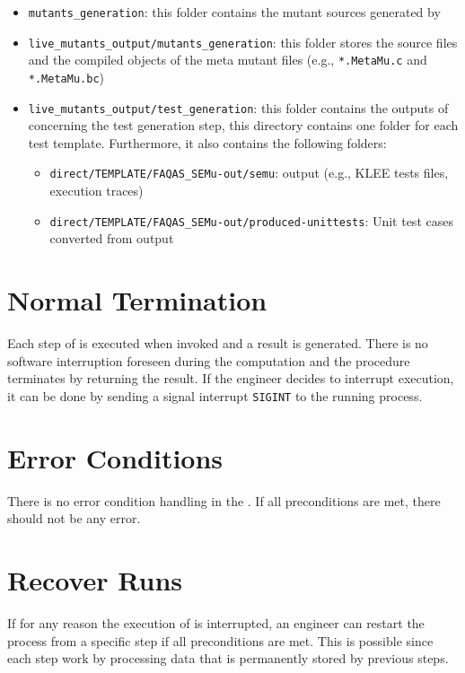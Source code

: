 \begin{itemize}
	\item \texttt{mutants\_generation}: this folder contains the mutant sources generated by \MASS
	\item \texttt{live\_mutants\_output/mutants\_generation}: this folder stores the source files and the compiled objects of the meta mutant files (e.g., \texttt{*.MetaMu.c} and \texttt{*.MetaMu.bc})
	\item \texttt{live\_mutants\_output/test\_generation}: this folder contains the outputs of \SEMUS concerning the test generation step, this directory contains one folder for each test template. Furthermore, it also contains the following folders:
	\begin{itemize}
		\item \texttt{direct/TEMPLATE/FAQAS\_SEMu-out/semu}: \SEMU output (e.g., KLEE tests files, execution traces)
		\item \texttt{direct/TEMPLATE/FAQAS\_SEMu-out/produced-unittests}: Unit test cases converted from \SEMU output
	\end{itemize}

\end{itemize}



\section{Normal Termination}


Each step of \SEMUS is executed when invoked and a result is generated. There is no software interruption foreseen during the computation and the procedure terminates by returning the result.
If the engineer decides to interrupt \SEMUS execution, it can be done by sending a signal interrupt \texttt{SIGINT} to the running process.

\section{Error Conditions}

There is no error condition handling in the \FAQAS. If all preconditions are met, there should not be any error.

\section{Recover Runs}


If for any reason the execution of \SEMUS is interrupted, an engineer can restart the process from a specific step if all preconditions are met. This is possible since each \SEMUS step work by processing data that is permanently stored by previous steps.
